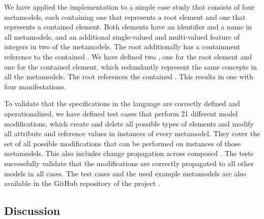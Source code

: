 We have applied the implementation to a simple case study that consists of four metamodels, each containing one \metaclass that represents a root element and one that represents a contained element. 
Both elements have an identifier and a name in all metamodels, and an additional single-valued and multi-valued feature of integers in two of the metamodels.
The root \metaclass additionally has a containment reference to the contained \metaclass.
We have defined two \commonalities, one for the root element and one for the contained element, which redundantly represent the same concepts in all the metamodels.
The root \commonality references the contained \commonality.
This results in one \conceptmetamodel with four manifestations.

To validate that the specifications in the \commonalities language are correctly defined and operationalized, we have
defined test cases that perform 21 different model modifications, which 
%
create and delete all possible types of elements and modify all attribute and reference values in instances of every metamodel.
They cover the set of all possible modifications that can be performed on instances of those metamodels.
This also includes change propagation across composed \commonalities.
The tests successfully validate that the modifications are correctly propagated to all other models in all cases.
The test cases and the used example metamodels are also available in the GitHub repository of the \vitruv project \cite{vitruvFrameworkGithub}. %


\subsection{Discussion}


